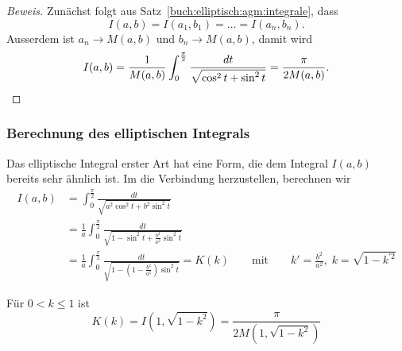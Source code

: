 \begin{proof}[Beweis]
Zunächst folgt aus Satz~\ref{buch:elliptisch:agm:integrale}, dass
\[
I(a,b)
=
I(a_1,b_1)
=
\dots
=
I(a_n,b_n).
\]
Ausserdem ist $a_n\to M(a,b)$ und $b_n\to M(a,b)$,
damit wird 
\[
I(a,b)
=
\frac{1}{M(a,b)}
\int_0^{\frac{\pi}2}
\frac{dt}{\sqrt{\cos^2 t + \sin^2 t}}
=
\frac{\pi}{2M(a,b)}.
\qedhere
\]
\end{proof}

%
%
\subsubsection{Berechnung des elliptischen Integrals}
Das elliptische Integral erster Art hat eine Form, die dem Integral
$I(a,b)$ bereits sehr ähnlich ist.
Im die Verbindung herzustellen, berechnen wir
\begin{align*}
I(a,b)
&=
\int_0^{\frac{\pi}2}
\frac{dt}{\sqrt{a^2\cos^2 t + b^2 \sin^2 t}}
\\
&=
\frac{1}{a}
\int_0^{\frac{\pi}2}
\frac{dt}{\sqrt{1-\sin^2 t + \frac{b^2}{a^2} \sin^2 t}}
\\
&=
\frac{1}{a}
\int_0^{\frac{\pi}2}
\frac{dt}{\sqrt{1-(1-\frac{b^2}{a^2})\sin^2 t}}
=
K(k)
\qquad\text{mit}\qquad
k'=\frac{b^2}{a^2},\;
k=\sqrt{1-k^{\prime 2}}
\end{align*}

\begin{satz}
\label{buch:elliptisch:agm:satz:Ek}
Für $0<k\le 1$ ist
\[
K(k) = I(1,\sqrt{1-k^2}) = \frac{\pi}{2M(1,\sqrt{1-k^2})}
\]
\end{satz}

%
%
